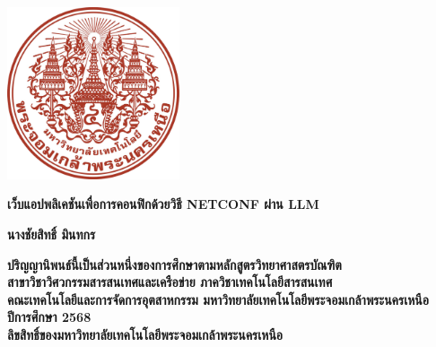 \newpage
\thispagestyle{empty}
\begin{center}

\includegraphics[width=5.08cm]{Image/Logo_KMUTNB_Thai.png}
\vspace{2mm}

{\bf
    เว็บแอปพลิเคชันเพื่อการคอนฟิกด้วยวิธี NETCONF ผ่าน LLM     %
}

\vspace{60mm}
{\bf
    นางชัยสิทธิ์ มินทกร %
}
\vspace{64mm}   






{\bf 
    ปริญญานิพนธ์นี้เป็นส่วนหนึ่งของการศึกษาตามหลักสูตรวิทยาศาสตรบัณฑิต\\
    สาขาวิชาวิศวกรรมสารสนเทศและเครือข่าย ภาควิชาเทคโนโลยีสารสนเทศ\\
    
    
    
    คณะเทคโนโลยีและการจัดการอุตสาหกรรม มหาวิทยาลัยเทคโนโลยีพระจอมเกล้าพระนครเหนือ    \\
    ปีการศึกษา 2568\\
    ลิขสิทธิ์ของมหาวิทยาลัยเทคโนโลยีพระจอมเกล้าพระนครเหนือ
}

\end{center}

